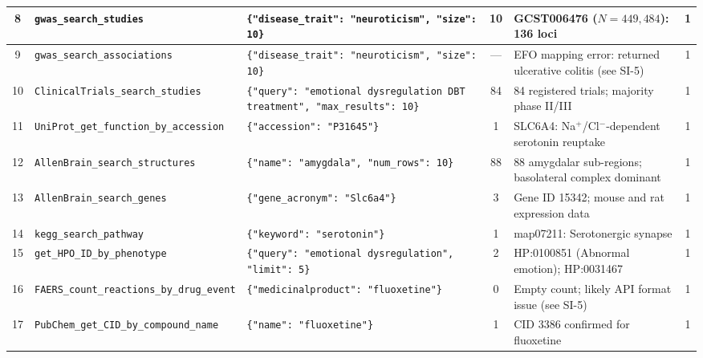 {\begin{longtable}{@{}c p{2.2cm} p{4.5cm} c p{4cm} c@{}}
8 &
\texttt{gwas\_search\_\allowbreak studies} &
\texttt{\{"disease\_trait": "neuroticism", "size": 10\}} &
10 &
GCST006476 ($N{=}449{,}484$): 136 loci &
1 \\
\midrule

9 &
\texttt{gwas\_search\_\allowbreak associations} &
\texttt{\{"disease\_trait": "neuroticism", "size": 10\}} &
--- &
EFO mapping error: returned ulcerative colitis (see SI-5) &
1 \\
\midrule

10 &
\texttt{ClinicalTrials\_\allowbreak search\_studies} &
\texttt{\{"query": "emotional dysregulation DBT treatment", "max\_results": 10\}} &
84 &
84 registered trials; majority phase II/III &
1 \\
\midrule

11 &
\texttt{UniProt\_get\_\allowbreak function\_by\_\allowbreak accession} &
\texttt{\{"accession": "P31645"\}} &
1 &
SLC6A4: Na$^+$/Cl$^-$-dependent serotonin reuptake &
1 \\
\midrule

12 &
\texttt{AllenBrain\_\allowbreak search\_\allowbreak structures} &
\texttt{\{"name": "amygdala", "num\_rows": 10\}} &
88 &
88 amygdalar sub-regions; basolateral complex dominant &
1 \\
\midrule

13 &
\texttt{AllenBrain\_\allowbreak search\_genes} &
\texttt{\{"gene\_acronym": "Slc6a4"\}} &
3 &
Gene ID 15342; mouse and rat expression data &
1 \\
\midrule

14 &
\texttt{kegg\_search\_\allowbreak pathway} &
\texttt{\{"keyword": "serotonin"\}} &
1 &
map07211: Serotonergic synapse &
1 \\
\midrule

15 &
\texttt{get\_HPO\_ID\_\allowbreak by\_phenotype} &
\texttt{\{"query": "emotional dysregulation", "limit": 5\}} &
2 &
HP:0100851 (Abnormal emotion); HP:0031467 &
1 \\
\midrule

16 &
\texttt{FAERS\_count\_\allowbreak reactions\_by\_\allowbreak drug\_event} &
\texttt{\{"medicinalproduct": "fluoxetine"\}} &
0 &
Empty count; likely API format issue (see SI-5) &
1 \\
\midrule

17 &
\texttt{PubChem\_get\_\allowbreak CID\_by\_\allowbreak compound\_name} &
\texttt{\{"name": "fluoxetine"\}} &
1 &
CID 3386 confirmed for fluoxetine &
1 \\
\midrule


\end{longtable}}
